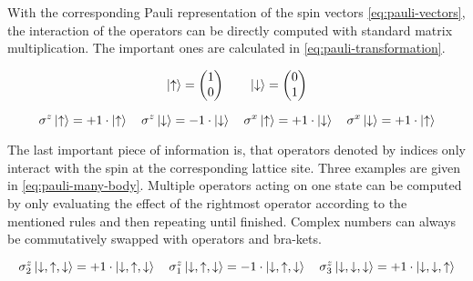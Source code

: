 With the corresponding Pauli representation of the spin vectors \ref{eq:pauli-vectors}, the interaction of the operators can be directly computed with standard matrix multiplication. The important ones are calculated in \ref{eq:pauli-transformation}.

\begin{equation}
    \label{eq:pauli-vectors}
    \ket{\uparrow} = \left(\begin{matrix}
        1\\0
    \end{matrix}\right)
    \qquad
    \ket{\downarrow} = \left(\begin{matrix}
        0\\1
    \end{matrix}\right)
\end{equation}


\begin{equation}
    \label{eq:pauli-transformation}
    \sigma^z \ket{\uparrow} = +1 \cdot \ket{\uparrow} \quad
    \sigma^z \ket{\downarrow} = -1 \cdot \ket{\downarrow} \quad
    \sigma^x \ket{\uparrow} = +1 \cdot \ket{\downarrow} \quad
    \sigma^x \ket{\downarrow} = +1 \cdot \ket{\uparrow}
\end{equation}

The last important piece of information is, that operators denoted by indices only interact with the spin at the corresponding lattice site. Three examples are given in \ref{eq:pauli-many-body}. Multiple operators acting on one state can be computed by only evaluating the effect of the rightmost operator according to the mentioned rules and then repeating until finished. Complex numbers can always be commutatively swapped with operators and bra-kets.

\begin{equation}
    \label{eq:pauli-many-body}
    \sigma^z_2 \ket{\downarrow, \uparrow, \downarrow} = +1 \cdot \ket{\downarrow, \uparrow, \downarrow} \quad
    \sigma^z_1 \ket{\downarrow, \uparrow, \downarrow} = -1 \cdot \ket{\downarrow, \uparrow, \downarrow} \quad
    \sigma^z_3 \ket{\downarrow, \downarrow, \downarrow} = +1 \cdot \ket{\downarrow, \downarrow, \uparrow}
\end{equation}  